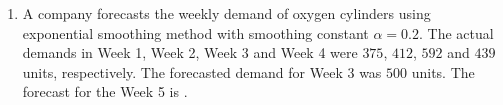 \documentclass[journal,12pt,onecolumn]{IEEEtran}
\theoremstyle{remark}
\begin{document}
\begin{enumerate}
    \hfill{}

    \item A company forecasts the weekly demand of oxygen cylinders using exponential smoothing method with smoothing constant $\alpha=0.2$. The actual demands in Week 1, Week 2, Week 3 and Week 4 were $375$, $412$, $592$ and $439$ units, respectively. The forecasted demand for Week 3 was $500$ units. The forecast  for the Week 5 is \underline{\hspace{2cm}}.

    \hfill{}
    
\end{enumerate}
\end{document}
